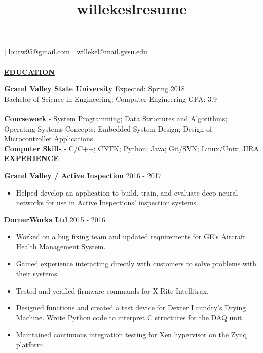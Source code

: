 \documentclass[12pt]{article}
\title{willekeslresume}
\newlength{\remaining}
\newcommand{\titleline}[1]{
\setlength{\remaining}{\textwidth-\widthof{\textsc{#1}}}
\noindent\underline{\textsc{#1}\hspace*{\remaining}}\par}
\begin{document}
{
	 | lourw95@gmail.com | willekel@mail.gvsu.edu \\
    \quad \\
	\titleline{\textbf{EDUCATION}}
    \noindent\textbf{Grand Valley State University} \hfill Expected: Spring 2018 \\
    Bachelor of Science in Engineering; Computer Engineering \hfill
    GPA: 3.9 \\
    \\
    \textbf{Coursework} - System Programming; Data Structures and Algorithms; Operating Systems Concepts; Embedded System Design; Design of Microcontroller Applications \\
    \textbf{Computer Skills} - C/C++; CNTK; Python; Java; Git/SVN; Linux/Unix; JIRA \\
    
    
    \titleline{\textbf{EXPERIENCE}}
    
    \noindent\textbf{Grand Valley / Active Inspection} \hfill 2016 - 2017
    \begin{itemize}[noitemsep]
    	\item Helped develop an application to build, train, and evaluate deep neural networks for use in Active Inspections' inspection systems.
    \end{itemize}
    
    \noindent\textbf{DornerWorks Ltd} \hfill 2015 - 2016
    \begin{itemize}[noitemsep]
    	\item Worked on a bug fixing team and updated requirements for GE's Aircraft Health Management System.
    	\item Gained experience interacting directly with customers to solve problems with their systems.
    	\item Tested and verified firmware commands for X-Rite Intellitrax.
    	\item Designed functions and created a test device for Dexter Laundry's Drying Machine. Wrote Python code to interpret C structures for the DAQ unit.
    	\item Maintained continuous integration testing for Xen hypervisor on the Zynq platform.
    \end{itemize}
    
}
\end{document}
